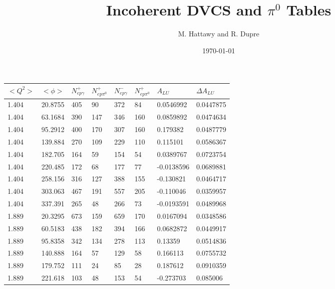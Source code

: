 \documentclass[12pt]{article}
\begin{document}
\title{Incoherent DVCS and $\pi^{0}$ Tables}


\author{M. Hattawy and R. Dupre \\[0.1ex]}


\date \today
%
\maketitle


\begin{table}[!h]
   \begin{center}
      \begin{tabular}{||l|l|l|l|l|l|l|l||}
         \hline
 
$<Q^{2}>$ & $<\phi>$   &$N^{+}_{ep\gamma}$    &$N^{+}_{ep\pi^{0}}$   
         &$N^{-}_{ep\gamma}$   &$N^{+}_{ep\pi^{0}}$    &$A_{LU}$    &$\Delta 
         A_{LU}$\\
\hline
\hline
1.404    &20.8755     &405    &90   &372   &84    &0.0546992    &0.0447875\\
1.404    &63.1684    &390    &147   &346   &160    &0.0859892    &0.0474634\\
1.404    &95.2912     &400    &170   &307   &160    &0.179382    &0.0487779\\
1.404    &139.884     &270    &109   &229   &110    &0.115101    &0.0586367\\
1.404    &182.705     &164    &59   &154   &54    &0.0389767    &0.0723754\\
1.404    &220.485     &172    &68   &177   &77    &-0.0138596    &0.0689881\\
1.404    &258.156      &316    &127   &388   &155    &-0.130821    &0.0464717\\
1.404    &303.063       &467    &191   &557   &205    &-0.110046    &0.0359957\\
1.404    &337.391     &265    &48   &266   &73    &-0.0193591    &0.0489968\\
\hline
1.889    &20.3295     &673    &159   &659   &170    &0.0167094    &0.0348586\\
1.889    &60.5183     &438    &182   &394   &166    &0.0682872    &0.0449917\\
1.889    &95.8358     &342    &134   &278   &113    &0.13359    &0.0514836\\
1.889    &140.888     &164    &57   &129   &58    &0.166113    &0.0755732\\
1.889    &179.752     &111    &24   &85   &28    &0.187612    &0.0910359\\
1.889    &221.618     &103    &48   &153   &54    &-0.273703    &0.085006\\

\end{tabular}
\end{center}
\end{table}
\end{document}
